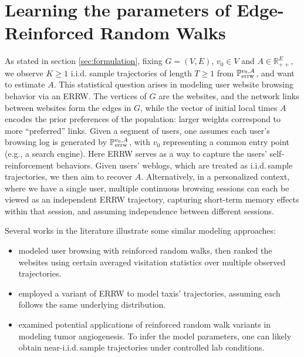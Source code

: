 \documentclass[a4paper, 11pt]{article}
\renewcommand{\P}{\mathbb{P}}
\newcommand{\Perrw}{\P_{\textnormal{errw}}}
\newif\ifva
\begin{document}
\section{Learning the parameters of Edge-Reinforced Random Walks}

As stated in section \ref{sec:formulation}, fixing $G=(V, E)$, $v_0\in V$ and $A\in\mathbb{R}_{++}^E$, we observe 
$K \ge 1$
i.i.d. sample trajectories of length 
$T \ge 1$
from $\Perrw^{v_0, A}$, and want to estimate $A$. 
This statistical question
arises in modeling user website browsing behavior via an ERRW. 
The vertices of $G$ are the websites, and the network links between websites form the edges in $G$, while the vector of initial local times $A$ encodes the prior preferences of the population: larger weights correspond to more ``preferred'' links. Given a segment of users, one assumes each user's browsing log is generated by $\Perrw^{v_0,A}$, with $v_0$ representing a common entry point (e.g., a search engine). Here ERRW serves as a way to capture the users' self-reinforcement behaviors. Given users' weblogs, which are treated as i.i.d.\,sample trajectories, we then aim to recover $A$. 
Alternatively, in a personalized context, where we have a single user, multiple continuous browsing sessions can each be viewed as an independent ERRW trajectory, capturing short-term memory effects within that session, and assuming independence between different sessions.

Several works in the literature illustrate some similar modeling approaches:
\begin{itemize}
    \item \cite{mgr, xzzs} modeled user browsing with reinforced random walks, then ranked the websites using certain averaged visitation statistics over multiple observed trajectories. 
    \item \cite{bgl} employed a variant of ERRW to model taxis' trajectories, assuming each follows the same underlying distribution. %
\ifva
\color{red}
\color{black}
\fi
    \item \cite{ps} examined potential applications of reinforced random walk variants in modeling tumor angiogenesis. To infer the model parameters, one can likely obtain near-i.i.d.\,sample trajectories under controlled lab conditions.
\end{itemize}
\end{document}
